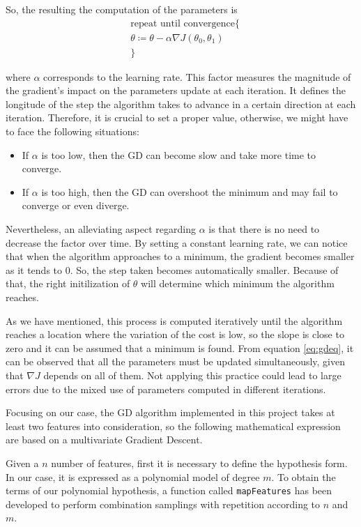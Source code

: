 \documentclass[a4paper, report, oneside, UKenglish]{memoir}
\begin{document}
So, the resulting the computation of the parameters is
\begin{equation}\label{eq:gdeq}
\begin{split}
    &\mbox{repeat until convergence}\{\\
    &\theta \coloneqq \theta - \alpha \nabla J(\theta_{0},\theta_{1})\\
&\}
\end{split}
\end{equation}

where $\alpha$ corresponds to the learning rate. This factor measures the magnitude of the gradient's impact on the parameters update at each iteration. It defines the longitude of the step the algorithm takes to advance in a certain direction at each iteration. Therefore, it is crucial to set a proper value, otherwise, we might have to face the following situations:
\begin{itemize}
    \item  If $\alpha$ is too low, then the GD can become slow and take more time to converge.
    \item  If $\alpha$ is too high, then the GD can overshoot the minimum and may fail to converge or even diverge.  
\end{itemize}

Nevertheless, an alleviating aspect regarding $\alpha$ is that there is no need to decrease the factor over time. By setting a constant learning rate, we can notice that when the algorithm approaches to a minimum, the gradient becomes smaller as it tends to 0. So, the step taken becomes automatically smaller. Because of that, the right initilization of $\theta$ will determine which minimum the algorithm reaches. 

As we have mentioned, this process is computed iteratively until the algorithm reaches a location where the variation of the cost is low, so the slope is close to zero and it can be assumed that a minimum is found. From equation \eqref{eq:gdeq}, it can be observed that all the parameters must be updated simultaneously, given that $\nabla J$ depends on all of them. Not applying this practice could lead to large errors due to the mixed use of parameters computed in different iterations. 

Focusing on our case, the GD algorithm implemented in this project takes at least two features into consideration, so the following mathematical expression are based on a multivariate Gradient Descent.  

Given a $n$ number of features, first it is necessary to define the hypothesis form. In our case, it is expressed as a polynomial model of degree $m$. To obtain the terms of our polynomial hypothesis, a function called \texttt{mapFeatures}  has been developed to perform combination samplings with repetition according to $n$ and $m$. 
\end{document}
